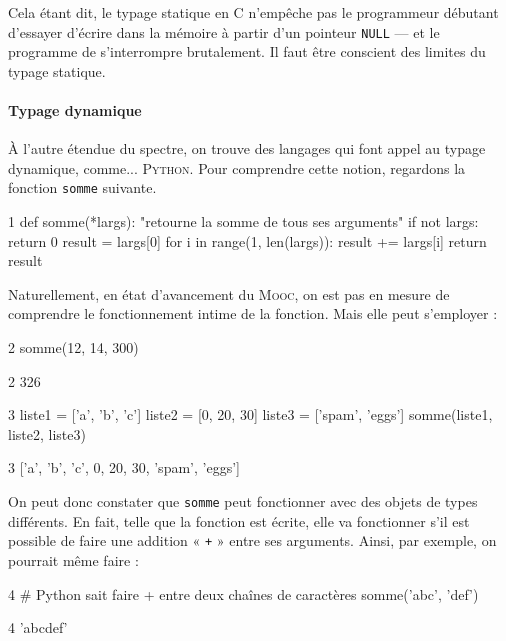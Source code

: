 Cela étant dit, le typage statique en C n'empêche pas le programmeur débutant d'essayer d'écrire dans la mémoire à partir d'un pointeur \texttt{NULL} --- et le programme de s'interrompre brutalement. Il faut être conscient des limites du typage statique.

\paragraph{Typage dynamique} À l'autre étendue du spectre, on trouve des langages qui font appel au typage dynamique, comme... \textsc{Python}.
Pour comprendre cette notion, regardons la fonction \texttt{somme} suivante.

\begin{nbjupyterin}[before skip=4pt, after skip=6pt]{1}
def somme(*largs):
	"retourne la somme de tous ses arguments"
	if not largs:
		return 0
		result = largs[0]
		for i in range(1, len(largs)):
			result += largs[i]
		return result
\end{nbjupyterin}

Naturellement, en état d'avancement du \textsc{Mooc}, on est pas en mesure de comprendre le fonctionnement intime de la fonction. Mais elle peut s'employer :

\begin{nbjupyterin}[before skip=4pt, after skip=1pt]{2}
somme(12, 14, 300)
\end{nbjupyterin}
\begin{nbjupyterout}[before skip=1pt, after skip=6pt]{2}
326
\end{nbjupyterout}

\begin{nbjupyterin}[before skip=1pt, after skip=1pt]{3}
liste1 = ['a', 'b', 'c']
liste2 = [0, 20, 30]
liste3 = ['spam', 'eggs']
somme(liste1, liste2, liste3)
\end{nbjupyterin}
\begin{nbjupyterout}[before skip=1pt, after skip=4pt]{3}
['a', 'b', 'c', 0, 20, 30, 'spam', 'eggs']
\end{nbjupyterout}
On peut donc constater que \texttt{somme} peut fonctionner avec des objets de types différents. En fait, telle que la fonction est écrite, elle va fonctionner s'il est possible de faire une addition « \texttt{+} » entre ses arguments. Ainsi, par exemple, on pourrait même faire :

\begin{nbjupyterin}[before skip=4pt, after skip=1pt]{4}
# Python sait faire + entre deux chaînes de caractères
somme('abc', 'def')
\end{nbjupyterin}
\begin{nbjupyterout}[before skip=1pt, after skip=4pt]{4}
'abcdef'
\end{nbjupyterout}

